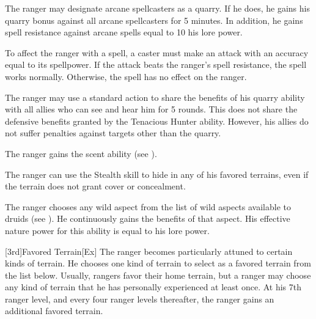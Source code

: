 The ranger may designate arcane spellcasters as a quarry.
If he does, he gains his quarry bonus against all arcane spellcasters for 5 minutes.
In addition, he gains spell resistance against arcane spells equal to 10 \add his lore power.

To affect the ranger with a spell, a caster must make an attack with an accuracy equal to its spellpower.
If the attack beats the ranger's spell resistance, the spell works normally.
Otherwise, the spell has no effect on the ranger.

The ranger may use a standard action to share the benefits of his quarry ability with all allies who can see and hear him for 5 rounds.
This does not share the defensive benefits granted by the Tenacious Hunter ability.
However, his allies do not suffer penalties against targets other than the quarry.

The ranger gains the scent ability (see ).

\label{Camouflage}
The ranger can use the Stealth skill to hide in any of his favored terrains, even if the terrain does not grant cover or concealment.

The ranger chooses any wild aspect from the list of wild aspects available to druids (see ).
He continuously gains the benefits of that aspect.
His effective nature power for this ability is equal to his lore power.

[3rd]{Favored Terrain}[Ex]
The ranger becomes particularly attuned to certain kinds of terrain.
He chooses one kind of terrain to select as a favored terrain from the list below.
Usually, rangers favor their home terrain, but a ranger may choose any kind of terrain that he has personally experienced at least once.
At his 7th ranger level, and every four ranger levels thereafter, the ranger gains an additional favored terrain.

